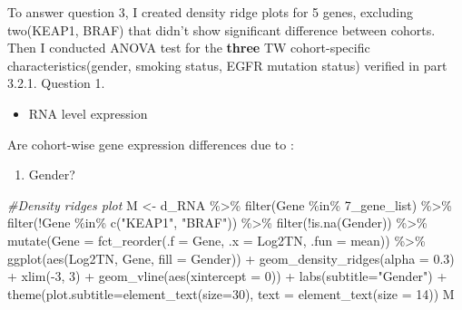 \documentclass[
]{article}
\newenvironment{Shaded}{\begin{snugshade}}{\end{snugshade}}
\newcommand{\AttributeTok}[1]{\textcolor[rgb]{0.77,0.63,0.00}{#1}}
\newcommand{\CommentTok}[1]{\textcolor[rgb]{0.56,0.35,0.01}{\textit{#1}}}
\newcommand{\DecValTok}[1]{\textcolor[rgb]{0.00,0.00,0.81}{#1}}
\newcommand{\FloatTok}[1]{\textcolor[rgb]{0.00,0.00,0.81}{#1}}
\newcommand{\FunctionTok}[1]{\textcolor[rgb]{0.00,0.00,0.00}{#1}}
\newcommand{\NormalTok}[1]{#1}
\newcommand{\OtherTok}[1]{\textcolor[rgb]{0.56,0.35,0.01}{#1}}
\newcommand{\SpecialCharTok}[1]{\textcolor[rgb]{0.00,0.00,0.00}{#1}}
\newcommand{\StringTok}[1]{\textcolor[rgb]{0.31,0.60,0.02}{#1}}
\providecommand{\tightlist}{%
  \setlength{\itemsep}{0pt}\setlength{\parskip}{0pt}}
\begin{document}
To answer question 3, I created density ridge plots for 5 genes,
excluding two(KEAP1, BRAF) that didn't show significant difference
between cohorts. Then I conducted ANOVA test for the \textbf{three} TW
cohort-specific characteristics(gender, smoking status, EGFR mutation
status) verified in part 3.2.1. Question 1.

\begin{itemize}
\tightlist
\item
  RNA level expression
\end{itemize}

Are cohort-wise gene expression differences due to :

\begin{enumerate}
\def\labelenumi{\arabic{enumi})}
\tightlist
\item
  Gender?
\end{enumerate}

\begin{Shaded}
\begin{Highlighting}[]
\CommentTok{\#Density ridges plot}
\NormalTok{M }\OtherTok{\textless{}{-}}\NormalTok{ d\_RNA }\SpecialCharTok{\%\textgreater{}\%}
 \FunctionTok{filter}\NormalTok{(Gene }\SpecialCharTok{\%in\%} \StringTok{\textasciigrave{}}\AttributeTok{7\_gene\_list}\StringTok{\textasciigrave{}}\NormalTok{) }\SpecialCharTok{\%\textgreater{}\%}
 \FunctionTok{filter}\NormalTok{(}\SpecialCharTok{!}\NormalTok{Gene }\SpecialCharTok{\%in\%} \FunctionTok{c}\NormalTok{(}\StringTok{"KEAP1"}\NormalTok{, }\StringTok{"BRAF"}\NormalTok{)) }\SpecialCharTok{\%\textgreater{}\%}
 \FunctionTok{filter}\NormalTok{(}\SpecialCharTok{!}\FunctionTok{is.na}\NormalTok{(Gender)) }\SpecialCharTok{\%\textgreater{}\%}
 \FunctionTok{mutate}\NormalTok{(}\AttributeTok{Gene =} \FunctionTok{fct\_reorder}\NormalTok{(}\AttributeTok{.f =}\NormalTok{ Gene, }\AttributeTok{.x =}\NormalTok{ Log2TN, }\AttributeTok{.fun =}\NormalTok{ mean)) }\SpecialCharTok{\%\textgreater{}\%}
 \FunctionTok{ggplot}\NormalTok{(}\FunctionTok{aes}\NormalTok{(Log2TN, Gene, }\AttributeTok{fill =}\NormalTok{ Gender)) }\SpecialCharTok{+} 
 \FunctionTok{geom\_density\_ridges}\NormalTok{(}\AttributeTok{alpha =} \FloatTok{0.3}\NormalTok{) }\SpecialCharTok{+}
 \FunctionTok{xlim}\NormalTok{(}\SpecialCharTok{{-}}\DecValTok{3}\NormalTok{, }\DecValTok{3}\NormalTok{) }\SpecialCharTok{+}
 \FunctionTok{geom\_vline}\NormalTok{(}\FunctionTok{aes}\NormalTok{(}\AttributeTok{xintercept =} \DecValTok{0}\NormalTok{)) }\SpecialCharTok{+}
 \FunctionTok{labs}\NormalTok{(}\AttributeTok{subtitle=}\StringTok{"Gender"}\NormalTok{) }\SpecialCharTok{+}
 \FunctionTok{theme}\NormalTok{(}\AttributeTok{plot.subtitle=}\FunctionTok{element\_text}\NormalTok{(}\AttributeTok{size=}\DecValTok{30}\NormalTok{),}
 \AttributeTok{text =} \FunctionTok{element\_text}\NormalTok{(}\AttributeTok{size =} \DecValTok{14}\NormalTok{))}
\NormalTok{M}
\end{Highlighting}
\end{Shaded}
\end{document}
